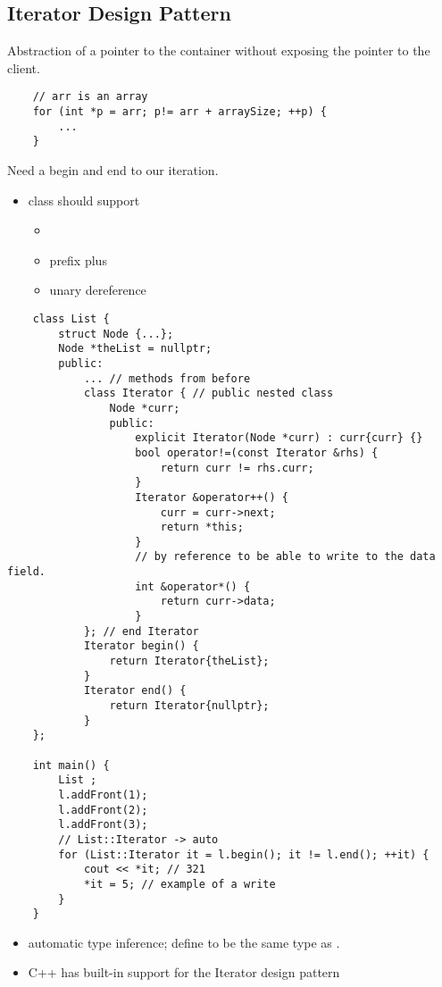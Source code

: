 \subsection{Iterator Design Pattern}
Abstraction of a pointer to the container without exposing the pointer to the client.
\begin{lstlisting}
    // arr is an array
    for (int *p = arr; p!= arr + arraySize; ++p) {
        ...
    }
\end{lstlisting}
Need a begin and end to our iteration.
\begin{itemize}
    \item class should support
          \begin{itemize}
              \item \code{!=}
              \item \code{++} \textrightarrow{} prefix plus
              \item \code{*} \textrightarrow{} unary dereference
          \end{itemize}
\end{itemize}

\begin{lstlisting}
    class List {
        struct Node {...};
        Node *theList = nullptr;
        public:
            ... // methods from before
            class Iterator { // public nested class
                Node *curr;
                public:
                    explicit Iterator(Node *curr) : curr{curr} {}
                    bool operator!=(const Iterator &rhs) {
                        return curr != rhs.curr;
                    }
                    Iterator &operator++() {
                        curr = curr->next;
                        return *this;
                    }
                    // by reference to be able to write to the data field.
                    int &operator*() {
                        return curr->data;
                    }
            }; // end Iterator
            Iterator begin() {
                return Iterator{theList};
            }
            Iterator end() {
                return Iterator{nullptr};
            }
    };

    int main() {
        List ;
        l.addFront(1);
        l.addFront(2);
        l.addFront(3);
        // List::Iterator -> auto
        for (List::Iterator it = l.begin(); it != l.end(); ++it) {
            cout << *it; // 321
            *it = 5; // example of a write
        }
    }

\end{lstlisting}
\begin{itemize}
    \item {} \textrightarrow{} automatic type inference; define 
          to be the same type as .
    \item C++ has built-in support for the Iterator design pattern
\end{itemize}
